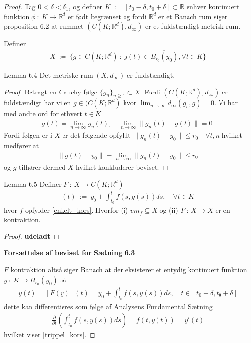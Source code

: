 \begin{proof}
  Tag $ 0 < \delta < \delta_1$, og definer $K \ := \ [t_0 - \delta, t_0 + \delta] \subset \mathbb{R}$ enhver kontinuert funktion $\phi \ : \ K \rightarrow \mathbb{R}^d$ er født begrænset og fordi $\mathbb{R}^d$ er et Banach rum siger proposition 6.2 at rummet $(C(K;\mathbb{R}^d), d_\infty)$ er et fuldstændigt metrisk rum.

  Definer
  \begin{align}\label{dobbelt_kors}
    X \ := \ \{ g \in C(K;\mathbb{R}^d) \ : \ g(t) \in \overline{B_{r_0}(y_0)}, \forall t \in K \}
  \end{align}
  \begin{boks}{Lemma 6.4}
    Det metriske rum $(X, d_\infty)$ er fuldstændigt.
  \end{boks}
  \begin{proof}
    Betragt en Cauchy følge $\{ g_n \}_{n\geq 1} \subset X$. Fordi $(C(K;\mathbb{R}^d), d_\infty)$ er fuldstændigt har vi en $g \in (C(K;\mathbb{R}^d)$ hvor $\lim_{n \rightarrow \infty} d_\infty(g_n, g) = 0$. Vi har med andre ord for ethvert $t\in K$
    \begin{align*}
      g(t) = \lim_{n \rightarrow \infty} g_n(t), \quad \lim_{n \rightarrow \infty} \| g_n(t) - g(t) \| = 0.
    \end{align*}
    Fordi følgen er i $X$ er det følgende opfyldt $\| g_n(t) - y_0 \| \leq r_0 \quad \forall t,n$ hvilket medfører at
    \begin{align*}
      \| g(t) - y_0 \| = \lim_{n \rightarrow \infty} \| g_n(t) - y_0 \| \leq r_0
    \end{align*}
    og $g$ tilhører dermed $X$ hvilket konkluderer beviset.
  \end{proof}
  \begin{boks}{Lemma 6.5}
    Definer $F \ : \ X \rightarrow C(K; \mathbb{R}^d)$
    \begin{align*}
      [F(g)](t) \ := \ y_0 + \int_{t_0}^t f(s,g(s))ds, \quad \forall t \in K
    \end{align*}
    hvor $f$ opfylder \eqref{enkelt_kors}. Hvorfor (i) $vm_f \subseteq X$ og (ii) $F \ : \ X \rightarrow X$ er en kontraktion.
  \end{boks}
  \begin{proof}
    \textbf{udeladt}
  \end{proof}
  \textbf{Forsættelse af beviset for Sætning 6.3}

  $F$ kontraktion altså siger Banach at der eksisterer et entydig kontinuert funktion $ y \ : \ K \rightarrow \overline{B_{r_0}(y_0)}$ så
  \begin{align*}
    y(t) = [F(y)](t) = y_0 + \int_{t_0}^tf(s,y(s))ds, \quad t\in [t_0 - \delta, t_0 + \delta]
  \end{align*}
  dette kan differentieres som følge af Analysens Fundamental Sætning
  \begin{align*}
    \frac{\partial}{\partial t}\left( \int_{t_0}^t f(s,y(s))ds \right) =
    f(t, y(t)) = y'(t)
  \end{align*}
  hvilket viser \eqref{trippel_kors}.
\end{proof}
